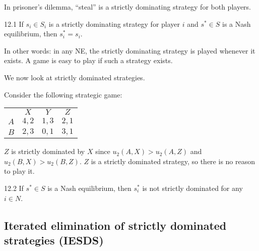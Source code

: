 \documentclass[12pt,letterpaper]{report}
\begin{document}
In prisoner's dilemma, ``steal'' is a strictly dominating strategy for both players.

\begin{lem}{}{12.1}
  If $s_i \in S_i$ is a strictly dominating strategy for player $i$ and $s^* \in S$ is a Nash
  equilibrium, then $s_i^* = s_i$.
\end{lem}

In other words: in any NE, the strictly dominating strategy is played whenever it exists.
A game is easy to play if such a strategy exists.

We now look at strictly dominated strategies.

\begin{ex}
  Consider the following strategic game:

  \begin{center}
    \renewcommand{\arraystretch}{1.25}
    \begin{tabular}{c |c|c|c|}
      \multicolumn{1}{c}{} & \multicolumn{1}{c}{$X$} & \multicolumn{1}{c}{$Y$}
        & \multicolumn{1}{c}{$Z$} \\
      \cline{2-4}
      $A$ & $4, 2$ & $1, 3$ & $2, 1$ \\
      \cline{2-4}
      $B$ & $2, 3$ & $0, 1$ & $3, 1$ \\
      \cline{2-4}
    \end{tabular}
  \end{center}

  $Z$ is strictly dominated by $X$ since $u_2(A, X) > u_2(A, Z)$ and $u_2(B, X) > u_2(B, Z)$.
  $Z$ is a strictly dominated strategy, so there is no reason to play it.
\end{ex}

\begin{lem}{}{12.2}
  If $s^* \in S$ is a Nash equilibrium, then $s_i^*$ is not strictly dominated for any $i \in N$.
\end{lem}

\pagebreak
\subsection{Iterated elimination of strictly dominated strategies (IESDS)}
\end{document}
